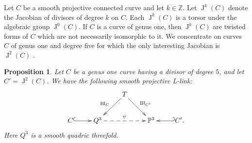 \documentclass[a4paper,12pt]{amsart}
\def\P{\mathbb P}
\def\Z{\mathbb Z}
\def\Bl{{\operatorname{Bl}}}
\def\Jac{{\operatorname{J}}}
\theoremstyle{plain}
\newtheorem{proposition}[dummy]{Proposition}
\numberwithin{equation}{section}
\theoremstyle{definition}
\renewcommand{\(}{\left(}
\renewcommand{\)}{\right)}
\begin{document}
Let $C$ be a smooth projective
connected
curve and let $k \in \Z$. 
Let $\Jac^k(C)$ denote
the Jacobian of divisors of degree $k$ on $C$.
Each $\Jac^k(C)$ is a torsor under
the algebraic group
$\Jac^0(C)$. 
If $C$ is a curve of genus one,
then
$\Jac^k(C)$
are twisted forms of $C$
which are not necessarily isomorphic to it.
We concentrate on curves $C$
of genus one and degree five for which
the only interesting Jacobian is $\Jac^2(C)$ \cite{ShinderZhang}.

\begin{proposition}\label{prop:elliptic}
Let $C$ be a genus one curve 
having
a divisor of degree $5$,
and let $C' = \Jac^2(C)$.
We have the following smooth projective L-link:
\begin{equation}\label{eq:L-link-curves}
 \xymatrix{
    & & T \ar[dl]_{\Bl_{C}} \ar[dr]^{\Bl_{C'}} & & \\
    C \ar@{^{(}->}[r] & Q^3 \ar@{-->}[rr]^\psi &  & \P^3 & \ar@{_{(}->}[l] C'.\\
}
\end{equation}
Here $Q^3$ is a smooth quadric threefold.
\end{proposition}
\end{document}
